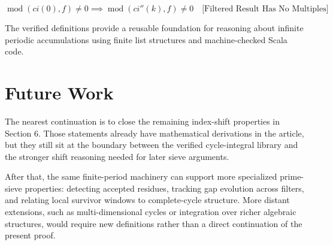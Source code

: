 \begin{equation*}
\operatorname{mod}(ci(0), f) \neq 0 \implies \operatorname{mod}(ci''(k), f) \neq 0
\quad \text{[Filtered Result Has No Multiples]}
\end{equation*}

The verified definitions provide a reusable foundation for reasoning about
infinite periodic accumulations using finite list structures and
machine-checked Scala code.

\section{Future Work}

The nearest continuation is to close the remaining index-shift properties in
Section 6. Those statements already have mathematical derivations in the
article, but they still sit at the boundary between the verified
cycle-integral library and the stronger shift reasoning needed for later
sieve arguments.

After that, the same finite-period machinery can support more specialized
prime-sieve properties: detecting accepted residues, tracking gap evolution
across filters, and relating local survivor windows to complete-cycle
structure. More distant extensions, such as multi-dimensional cycles or
integration over richer algebraic structures, would require new definitions
rather than a direct continuation of the present proof.
